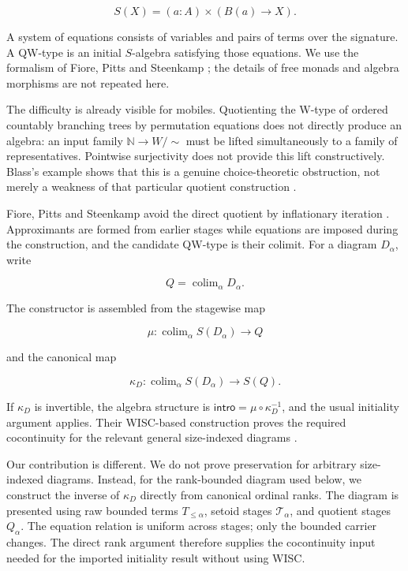 \documentclass[runningheads]{llncs}
\begin{document}
\[
S(X)=(a:A)\times(B(a)\to X).
\]

A system of equations consists of variables and pairs of terms over the
signature. A QW-type is an initial \(S\)-algebra satisfying those
equations. We use the formalism of Fiore, Pitts and Steenkamp
\citep{fiore2020-infinitary-qiit,fiore2022-quotient-inductive}; the
details of free monads and algebra morphisms are not repeated here.

The difficulty is already visible for mobiles. Quotienting the W-type of
ordered countably branching trees by permutation equations does not
directly produce an algebra: an input family
\(\mathbb{N}\to W/{\sim}\) must be lifted simultaneously to a family of
representatives. Pointwise surjectivity does not provide this lift
constructively. Blass's example shows that this is a genuine
choice-theoretic obstruction, not merely a weakness of that particular
quotient construction \citep{blass1983-free-algebra-coequalizer}.

Fiore, Pitts and Steenkamp avoid the direct quotient by inflationary
iteration \citep{fiore2022-quotient-inductive,
pitts2022-inflationary-iteration}. Approximants are formed from earlier
stages while equations are imposed during the construction, and the
candidate QW-type is their colimit. For a diagram \(D_\alpha\), write

\[
Q=\operatorname{colim}_\alpha D_\alpha.
\]

The constructor is assembled from the stagewise map

\[
\mu:\operatorname{colim}_\alpha S(D_\alpha)\longrightarrow Q
\]

and the canonical map

\[
\kappa_D:\operatorname{colim}_\alpha S(D_\alpha)\longrightarrow S(Q).
\]

If \(\kappa_D\) is invertible, the algebra structure is
\(\mathsf{intro}=\mu\circ\kappa_D^{-1}\), and the usual initiality
argument applies. Their WISC-based construction proves the required
cocontinuity for the relevant general size-indexed diagrams
\citep{fiore2022-quotient-inductive}.

Our contribution is different. We do not prove preservation for arbitrary
size-indexed diagrams. Instead, for the rank-bounded diagram used below,
we construct the inverse of \(\kappa_D\) directly from canonical ordinal
ranks. The diagram is presented using raw bounded terms
\(T_{\leq\alpha}\), setoid stages \(\mathcal{T}_\alpha\), and quotient
stages \(Q_\alpha\). The equation relation is uniform across stages; only
the bounded carrier changes. The direct rank argument therefore supplies
the cocontinuity input needed for the imported initiality result without
using WISC.
\end{document}
